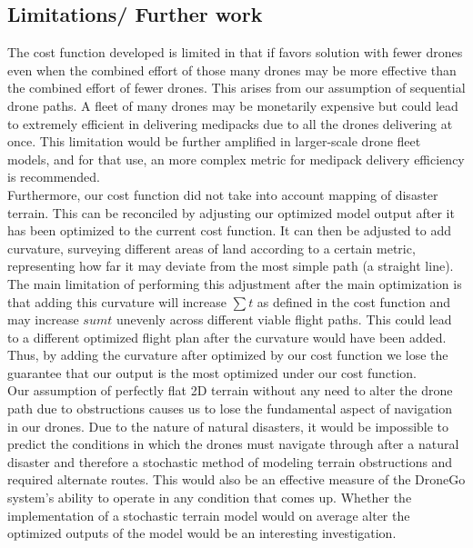 \documentclass[twocolumn,10pt]{asme2ej}
\begin{document}
\subsection{Limitations/ Further work}
The cost function developed is limited in that if favors solution with fewer drones even when the combined effort of those many drones may be more effective than the combined effort of fewer drones. This arises from our assumption of sequential drone paths. A fleet of many drones may be monetarily expensive but could lead to extremely efficient in delivering medipacks due to all the drones delivering at once. This limitation would be further amplified in larger-scale drone fleet models, and for that use, an more complex metric for medipack delivery efficiency is recommended. \\
Furthermore, our cost function did not take into account mapping of disaster terrain. This can be reconciled by adjusting our optimized model output after it has been optimized to the current cost function. It can then be adjusted to add curvature, surveying different areas of land according to a certain metric, representing how far it may deviate from the most simple path (a straight line). The main limitation of performing this adjustment after the main optimization is that adding this curvature will increase $\sum{t}$ as defined in the cost function and may increase $sum{t}$ unevenly across different viable flight paths. This could lead to a different optimized flight plan after the curvature would have been added. Thus, by adding the curvature after optimized by our cost function we lose the guarantee that our output is the most optimized under our cost function. \\
Our assumption of perfectly flat 2D terrain without any need to alter the drone path due to obstructions causes us to lose the fundamental aspect of navigation in our drones. Due to the nature of natural disasters, it would be impossible to predict the conditions in which the drones must navigate through after a natural disaster and therefore a stochastic method of modeling terrain obstructions and required alternate routes. This would also be an effective measure of the DroneGo system's ability to operate in any condition that comes up. Whether the implementation of a stochastic terrain model would on average alter the optimized outputs of the model would be an interesting investigation. \\
\end{document}
